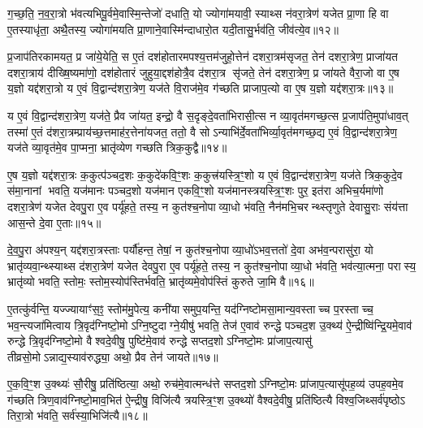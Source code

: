ग॒च्छ॒ति॒ न॒व॒रा॒त्रो भ॑वत्यभिपू॒र्वमे॒वास्मि॒न्तेजो॑ दधाति॒ यो ज्योगा॑मयावी॒ स्याथ्स न॑वरा॒त्रेण॑ यजेत प्रा॒णा हि वा ए॒तस्याधृ॑ता॒ अथै॒तस्य॒ ज्योगा॑मयति प्रा॒णाने॒वास्मि॑न्दाधारो॒त यदी॒तासु॒र्भव॑ति॒ जीव॑त्ये॒व॥१२॥

{\anuvakamend[{कल्प॑न्ते प्र॒जाना॒न्त्रय॑स्त्रिशच्च॥४॥}]}

प्र॒जाप॑तिरकामयत॒ प्र जा॑ये॒येति॒ स ए॒तं दश॑होतारमपश्य॒त्तम॑जुहो॒त्तेन॑ दशरा॒त्रम॑सृजत॒ तेन॑ दशरा॒त्रेण॒ प्राजा॑यत दशरा॒त्राय॑ दीख्षि॒ष्यमा॑णो॒ दश॑होतारं जुहुया॒द्दश॑होत्रै॒व द॑शरा॒त्र सृ॑जते॒ तेन॑ दशरा॒त्रेण॒ प्र जा॑यते वैरा॒जो वा ए॒ष य॒ज्ञो यद्द॑शरा॒त्रो य ए॒वं वि॒द्वान्द॑शरा॒त्रेण॒ यज॑ते वि॒राज॑मे॒व ग॑च्छति प्राजाप॒त्यो वा ए॒ष य॒ज्ञो यद्द॑शरा॒त्रः॥१३॥

य ए॒वं वि॒द्वान्द॑शरा॒त्रेण॒ यज॑ते॒ प्रैव जा॑यत॒ इन्द्रो॒ वै स॒दृङ्दे॒वता॑भिरासी॒त्स न व्या॒वृत॑मगच्छ॒त्स प्र॒जाप॑ति॒मुपा॑धाव॒त् तस्मा॑ ए॒तं द॑शरा॒त्रम्प्राय॑च्छ॒त्तमाह॑र॒त्तेना॑यजत॒ ततो॒ वै सोऽन्याभि॑र्दे॒वता॑भिर्व्या॒वृत॑मगच्छ॒द्य ए॒वं वि॒द्वान्द॑शरा॒त्रेण॒ यज॑ते व्या॒वृत॑मे॒व पा॒प्मना॒ भ्रातृ॑व्येण गच्छति त्रिक॒कुद्वै॥१४॥

ए॒ष य॒ज्ञो यद्द॑शरा॒त्रः क॒कुत्प॑ञ्चद॒शः क॒कुदे॑कवि॒ꣳ॒शः क॒कुत्त्र॑यस्त्रि॒ꣳ॒शो य ए॒वं वि॒द्वान्द॑शरा॒त्रेण॒ यज॑ते त्रिक॒कुदे॒व स॑मा॒नानां भवति॒ यज॑मानः पञ्चद॒शो यज॑मान एकवि॒ꣳ॒शो यज॑मानस्त्रयस्त्रि॒ꣳ॒शः पुर॒ इत॑रा अभिच॒र्यमा॑णो दशरा॒त्रेण॑ यजेत देवपु॒रा ए॒व पर्यू॑हते॒ तस्य॒ न कुत॑श्च॒नोपाव्या॒धो भ॑वति॒ नैन॑मभि॒चरन्थ्स्तृणुते देवासु॒राः संय॑त्ता आस॒न्ते दे॒वा ए॒ताः॥१५॥

दे॒व॒पु॒रा अ॑पश्य॒न् यद्द॑शरा॒त्रस्ताः पर्यौ॑हन्त॒ तेषां॒ न कुत॑श्च॒नोपाव्या॒धो॑ऽभव॒त्ततो॑ दे॒वा अभ॑व॒न्परासु॑रा॒ यो भ्रातृ॑व्यवा॒न्थ्स्याथ्स द॑शरा॒त्रेण॑ यजेत देवपु॒रा ए॒व पर्यू॑हते॒ तस्य॒ न कुत॑श्च॒नोपाव्या॒धो भ॑वति॒ भव॑त्या॒त्मना॒ परास्य॒ भ्रातृ॑व्यो भवति॒ स्तोमः॒ स्तोम॒स्योप॑स्तिर्भवति॒ भ्रातृ॑व्यमे॒वोप॑स्तिं कुरुते जा॒मि वै॥१६॥

ए॒तत्कु॑र्वन्ति॒ यज्ज्यायाꣳ॑स॒ꣵ॒ स्तोम॑मु॒पेत्य॒ कनी॑यासमुप॒यन्ति॒ यद॑ग्निष्टोमसा॒मान्य॒वस्ताच्च प॒रस्ताच्च॒ भव॒न्त्यजा॑मित्वाय त्रि॒वृद॑ग्निष्टो॒मोऽग्नि॒ष्टुदाग्ने॒यीषु॑ भवति॒ तेज॑ ए॒वाव॑ रुन्द्धे पञ्चद॒श उ॒क्थ्य॑ ऐ॒न्द्रीष्वि॑न्द्रि॒यमे॒वाव॑ रुन्द्धे त्रि॒वृद॑ग्निष्टो॒मो वैश्वदे॒वीषु॒ पुष्टि॑मे॒वाव॑ रुन्द्धे सप्तद॒शोऽग्निष्टो॒मः प्रा॑जाप॒त्यासु॑ तीव्रसो॒मोऽन्नाद्य॒स्याव॑रुद्ध्या॒ अथो॒ प्रैव तेन॑ जायते॥१७॥

ए॒क॒वि॒ꣳ॒श उ॒क्थ्यः॑ सौ॒रीषु॒ प्रति॑ष्ठित्या॒ अथो॒ रुच॑मे॒वात्मन्ध॑त्ते सप्तद॒शोऽग्निष्टो॒मः प्रा॑जाप॒त्यासू॑पह॒व्य॑ उपह॒वमे॒व ग॑च्छति त्रिण॒वाव॑ग्निष्टो॒माव॒भित॑ ऐ॒न्द्रीषु॒ विजि॑त्यै त्रयस्त्रि॒ꣳ॒श उ॒क्थ्यो॑ वैश्वदे॒वीषु॒ प्रति॑ष्ठित्यै विश्व॒जिथ्सर्व॑पृष्ठोऽ तिरा॒त्रो भ॑वति॒ सर्व॑स्या॒भिजि॑त्यै॥१८॥

